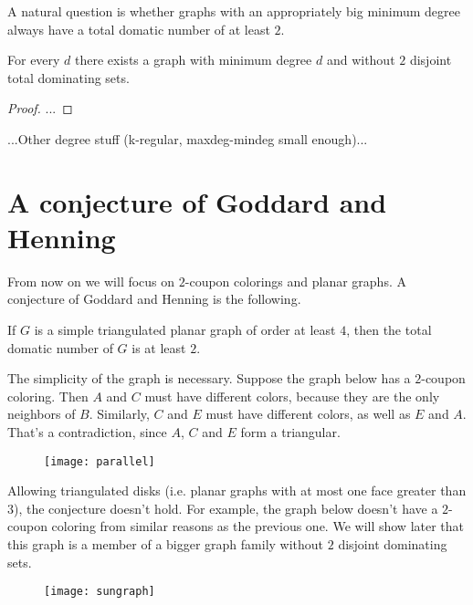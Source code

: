 A natural question is whether graphs with an appropriately big minimum degree
always have a total domatic number of at least $2$.

\begin{thm}
  For every $d$ there exists a graph with minimum degree $d$ and without $2$
  disjoint total dominating sets.
\end{thm}
\begin{proof}
  ...
\end{proof}

...Other degree stuff (k-regular, maxdeg-mindeg small enough)...

\section{A conjecture of Goddard and Henning}

From now on we will focus on $2$-coupon colorings and planar graphs. A
conjecture of Goddard and Henning is the following.

\begin{conj}
  If $G$ is a simple triangulated planar graph of order at least $4$, then the
  total domatic number of $G$ is at least $2$.
\end{conj}

\begin{remark}
  The simplicity of the graph is necessary. Suppose the graph below has a
  $2$-coupon coloring. Then $A$ and $C$ must have different colors, because
  they are the only neighbors of $B$. Similarly, $C$ and $E$ must have different
  colors, as well as $E$ and $A$. That's a contradiction, since $A$, $C$ and
  $E$ form a triangular.
\end{remark}

\begin{figure}[h]
  \centering
  \texttt{[image: parallel]}
\end{figure}

\begin{remark}
  Allowing triangulated disks (i.e. planar graphs with at most one face greater
  than $3$), the conjecture doesn't hold. For example, the graph below doesn't
  have a $2$-coupon coloring from similar reasons as the previous one. We will
  show later that this graph is a member of a bigger graph family without $2$
  disjoint dominating sets.
\end{remark}

\begin{figure}[h]
  \centering
  \texttt{[image: sungraph]}
\end{figure}

